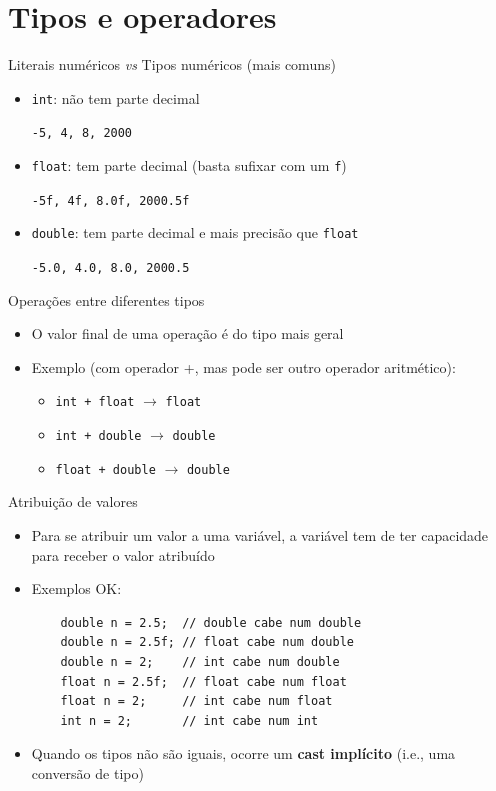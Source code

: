 \documentclass[portuguese, aspectratio=169, xcolor=table]{beamer}
\begin{document}
\section{Tipos e operadores}
\begin{frame}{Literais numéricos \textit{vs} Tipos numéricos (mais comuns)}
\begin{itemize}
    \item \texttt{int}: não tem parte decimal
    
    \hspace{0.25cm}
    \texttt{-5, 4, 8, 2000}
    \item \texttt{float}: tem parte decimal (basta sufixar com um \texttt{f})
    
    \hspace{0.25cm}
    \texttt{-5f, 4f, 8.0f, 2000.5f}
    \item \texttt{double}: tem parte decimal e mais precisão que \texttt{float}
    
    \hspace{0.25cm}
    \texttt{-5.0, 4.0, 8.0, 2000.5}
\end{itemize}
\end{frame}

\begin{frame}{Operações entre diferentes tipos}
\begin{itemize}
    \item O valor final de uma operação é do tipo mais geral
    \item Exemplo (com operador +, mas pode ser outro operador aritmético): 
    \begin{itemize}
        \item \texttt{int + float} $\rightarrow$ \texttt{float}
        \item \texttt{int + double} $\rightarrow$ \texttt{double}
        \item \texttt{float + double} $\rightarrow$ \texttt{double}
    \end{itemize}
\end{itemize}
\end{frame}

\begin{frame}[fragile]{Atribuição de valores}
\begin{itemize}
\item Para se atribuir um valor a uma variável, a variável tem de ter capacidade para receber o valor atribuído
\item Exemplos OK:
\begin{verbatim}
    double n = 2.5;  // double cabe num double
    double n = 2.5f; // float cabe num double
    double n = 2;    // int cabe num double
    float n = 2.5f;  // float cabe num float
    float n = 2;     // int cabe num float
    int n = 2;       // int cabe num int
\end{verbatim}
\item Quando os tipos não são iguais, ocorre um \textbf{cast implícito} (i.e., uma conversão de tipo)
\end{itemize}
\end{frame}
\end{document}
